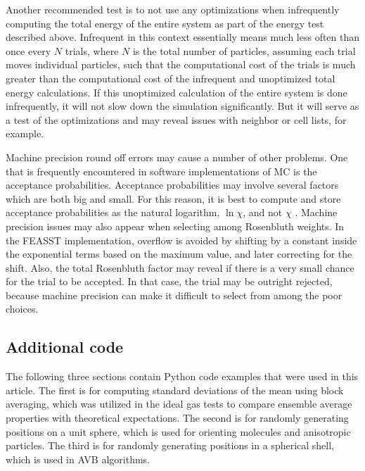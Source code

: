 \documentclass[
  9pt,
  bestpractices,
]{livecoms}
\begin{document}
Another recommended test is to not use any optimizations when infrequently computing the total energy of the entire system as part of the energy test described above.
Infrequent in this context essentially means much less often than once every $N$ trials, where $N$ is the total number of particles, assuming each trial moves individual particles, such that the computational cost of the trials is much greater than the computational cost of the infrequent and unoptimized total energy calculations.
If this unoptimized calculation of the entire system is done infrequently, it will not slow down the simulation significantly.
But it will serve as a test of the optimizations and may reveal issues with neighbor or cell lists, for example.

Machine precision round off errors may cause a number of other problems.
One that is frequently encountered in software implementations of MC is the acceptance probabilities.
Acceptance probabilities may involve several factors which are both big and small.
For this reason, it is best to compute and store acceptance probabilities as the natural logarithm, $\ln\chi$, and not $\chi$ \cite{shah_cassandra_2017}.
Machine precision issues may also appear when selecting among Rosenbluth weights.
In the FEASST \cite{hatch_monte_2024} implementation, overflow is avoided by shifting by a constant inside the exponential terms based on the maximum value, and later correcting for the shift.
Also, the total Rosenbluth factor may reveal if there is a very small chance for the trial to be accepted.
In that case, the trial may be outright rejected, because machine precision can make it difficult to select from among the poor choices.

\subsection{\label{sec:code}Additional code}

The following three sections contain Python code examples that were used in this article.
The first is for computing standard deviations of the mean using block averaging, which was utilized in the ideal gas tests to compare ensemble average properties with theoretical expectations.
The second is for randomly generating positions on a unit sphere, which is used for orienting molecules and anisotropic particles.
The third is for randomly generating positions in a spherical shell, which is used in AVB algorithms.
\end{document}
